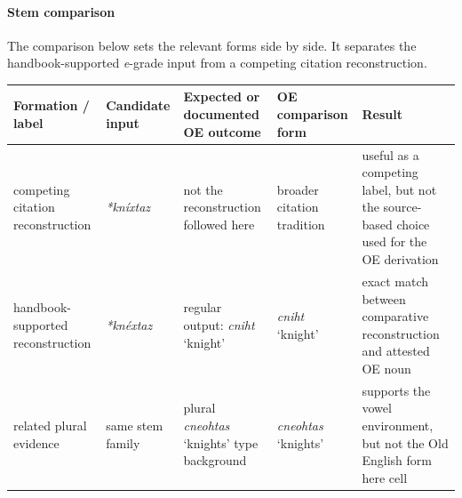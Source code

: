 \documentclass[
  british,
  a4paper,
]{article}
\newcounter{none} %
\begin{document}
\paragraph{Stem comparison}\label{stem-comparison-1}

The comparison below sets the relevant forms side by side. It separates
the handbook-supported \emph{e}-grade input from a competing citation
reconstruction.

{\def\LTcaptype{none} %
\begin{longtable}[]{@{}
  >{\raggedright\arraybackslash}p{}
  >{\raggedright\arraybackslash}p{}
  >{\raggedright\arraybackslash}p{}
  >{\raggedright\arraybackslash}p{}
  >{\raggedright\arraybackslash}p{}@{}}
\toprule\noalign{}
\begin{minipage}[b]{\linewidth}\raggedright
Formation / label
\end{minipage} & \begin{minipage}[b]{\linewidth}\raggedright
Candidate input
\end{minipage} & \begin{minipage}[b]{\linewidth}\raggedright
Expected or documented OE outcome
\end{minipage} & \begin{minipage}[b]{\linewidth}\raggedright
OE comparison form
\end{minipage} & \begin{minipage}[b]{\linewidth}\raggedright
Result
\end{minipage} \\
\midrule\noalign{}
\endhead
\bottomrule\noalign{}
\endlastfoot
competing citation reconstruction & {\emph{*kníxtaz}} & not the
reconstruction followed here & broader citation tradition & useful as a
competing label, but not the source-based choice used for the OE
derivation \\
handbook-supported reconstruction & {\emph{*knéxtaz}} & regular output:
{\emph{cniht}} `knight' & {\emph{cniht}} `knight' & exact match between
comparative reconstruction and attested OE noun \\
related plural evidence & same stem family & plural {\emph{cneohtas}}
`knights' type background & {\emph{cneohtas}} `knights' & supports the
vowel environment, but not the Old English form here cell \\
\end{longtable}
}
\end{document}

